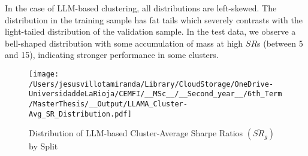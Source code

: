 %
%

In the case of LLM-based clustering,  
 all distributions are left-skewed. The distribution in the training sample has fat tails which severely contrasts with the light-tailed distribution of the validation sample. In the test data, we observe a bell-shaped distribution with some accumulation of mass at high $SR$s (between 5 and 15), indicating stronger performance in some clusters.
\begin{figure}[H]
  \centering
  \caption{Distribution of LLM-based Cluster-Average Sharpe Ratios $(\overline{SR}_g)$ by Split}
  \texttt{[image: /Users/jesusvillotamiranda/Library/CloudStorage/OneDrive-UniversidaddeLaRioja/CEMFI/\_\_MSc\_\_/\_\_Second\_year\_\_/6th\_Term/MasterThesis/\_\_Output/LLAMA\_Cluster-Avg\_SR\_Distribution.pdf]}
  \label{fig:LLM_cluster-average-SR-by-split}

\end{figure}



